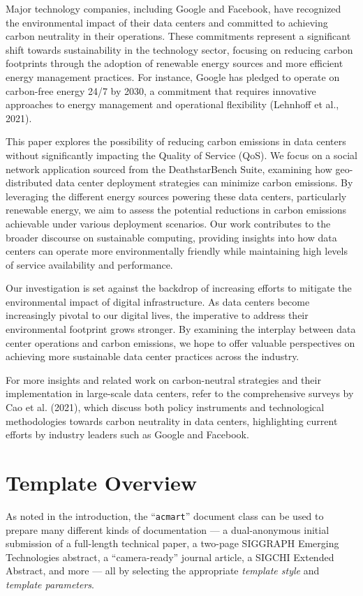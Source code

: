 \documentclass[acmlarge]{acmart}
\begin{document}
Major technology companies, including Google and Facebook, have recognized the environmental impact of their data centers and committed to achieving carbon neutrality in their operations. These commitments represent a significant shift towards sustainability in the technology sector, focusing on reducing carbon footprints through the adoption of renewable energy sources and more efficient energy management practices. For instance, Google has pledged to operate on carbon-free energy 24/7 by 2030, a commitment that requires innovative approaches to energy management and operational flexibility (Lehnhoff et al., 2021).

This paper explores the possibility of reducing carbon emissions in data centers without significantly impacting the Quality of Service (QoS). We focus on a social network application sourced from the DeathstarBench Suite, examining how geo-distributed data center deployment strategies can minimize carbon emissions. By leveraging the different energy sources powering these data centers, particularly renewable energy, we aim to assess the potential reductions in carbon emissions achievable under various deployment scenarios. Our work contributes to the broader discourse on sustainable computing, providing insights into how data centers can operate more environmentally friendly while maintaining high levels of service availability and performance.

Our investigation is set against the backdrop of increasing efforts to mitigate the environmental impact of digital infrastructure. As data centers become increasingly pivotal to our digital lives, the imperative to address their environmental footprint grows stronger. By examining the interplay between data center operations and carbon emissions, we hope to offer valuable perspectives on achieving more sustainable data center practices across the industry.

For more insights and related work on carbon-neutral strategies and their implementation in large-scale data centers, refer to the comprehensive surveys by Cao et al. (2021), which discuss both policy instruments and technological methodologies towards carbon neutrality in data centers, highlighting current efforts by industry leaders such as Google and Facebook.

	
	\section{Template Overview}
	As noted in the introduction, the ``\verb|acmart|'' document class can
	be used to prepare many different kinds of documentation --- a
	dual-anonymous initial submission of a full-length technical paper, a
	two-page SIGGRAPH Emerging Technologies abstract, a ``camera-ready''
	journal article, a SIGCHI Extended Abstract, and more --- all by
	selecting the appropriate {\itshape template style} and {\itshape
		template parameters}.
	
\end{document}
